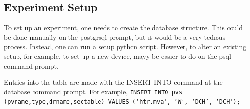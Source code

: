 \documentclass[10pt]{revtex4}
\begin{document}
\subsection{Experiment Setup}
To set up an experiment, one needs to create the database structure.
This could be done manually on the postgrsql prompt, but it would be
a very tedious process.
Instead, one can run a setup python script.
However, to alter an existing setup, for example, to set-up a new
device, mayy be easier to do on the psql command prompt.
\par
Entries into the table are made with the INSERT INTO command at the
database command prompt.
For example,
{\tt INSERT INTO pvs (pvname,type,drname,sectable) VALUES
(`htr.mva', `W', `DCH', `DCH');
}
%
%
%
\end{document}

